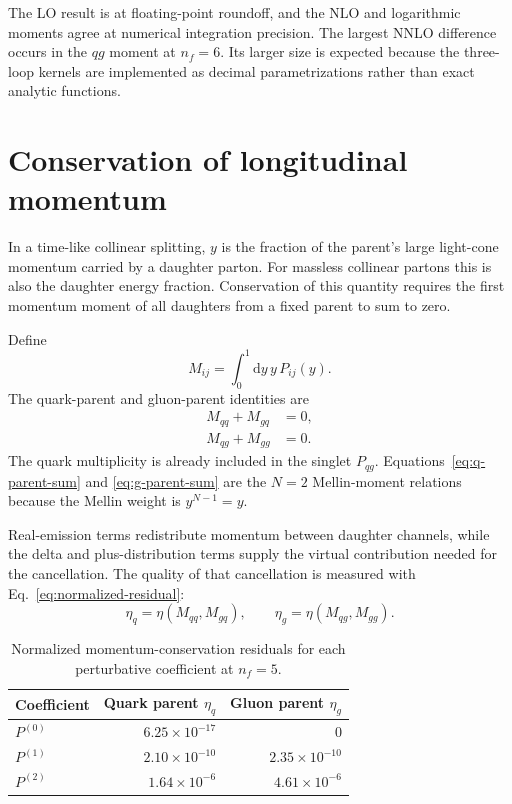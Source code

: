 \documentclass[11pt]{article}
\newcommand{\dd}{\mathrm{d}}
\begin{document}
The LO result is at floating-point roundoff, and the NLO and logarithmic
moments agree at numerical integration precision. The largest NNLO
difference occurs in the \(qg\) moment at \(n_f=6\). Its larger size is
expected because the three-loop kernels are implemented as decimal
parametrizations rather than exact analytic functions.

\section{Conservation of longitudinal momentum}

In a time-like collinear splitting, \(y\) is the fraction of the parent's
large light-cone momentum carried by a daughter parton. For massless
collinear partons this is also the daughter energy fraction. Conservation of
this quantity requires the first momentum moment of all daughters from a
fixed parent to sum to zero.

Define
\begin{equation}
  M_{ij}
  =
  \int_0^1\dd y\,y\,P_{ij}(y).
  \label{eq:momentum-matrix}
\end{equation}
The quark-parent and gluon-parent identities are
\begin{align}
  M_{qq}+M_{gq}&=0,
  \label{eq:q-parent-sum}\\
  M_{qg}+M_{gg}&=0.
  \label{eq:g-parent-sum}
\end{align}
The quark multiplicity is already included in the singlet \(P_{qg}\).
Equations~\eqref{eq:q-parent-sum} and \eqref{eq:g-parent-sum} are the
\(N=2\) Mellin-moment relations because the Mellin weight is
\(y^{N-1}=y\).

Real-emission terms redistribute momentum between daughter channels, while
the delta and plus-distribution terms supply the virtual contribution needed
for the cancellation. The quality of that cancellation is measured with
Eq.~\eqref{eq:normalized-residual}:
\[
  \eta_q=\eta(M_{qq},M_{gq}),
  \qquad
  \eta_g=\eta(M_{qg},M_{gg}).
\]

\begin{table}[H]
\centering
\caption{Normalized momentum-conservation residuals for each perturbative
coefficient at \(n_f=5\).}
\label{tab:coefficient-momentum}
\begin{tabular}{lrr}
\toprule
Coefficient & Quark parent \(\eta_q\) & Gluon parent \(\eta_g\)\\
\midrule
\(P^{(0)}\) & \(6.25\times10^{-17}\) & \(0\)\\
\(P^{(1)}\) & \(2.10\times10^{-10}\) & \(2.35\times10^{-10}\)\\
\(P^{(2)}\) & \(1.64\times10^{-6}\) & \(4.61\times10^{-6}\)\\
\bottomrule
\end{tabular}
\end{table}
\end{document}
